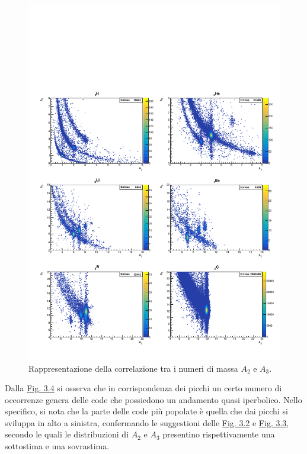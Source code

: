 \documentclass[12pt,a4paper,twoside]{report}
\begin{document}
	\begin{figure}[H]
		\centering
		\includegraphics[width=1.\linewidth]{c_MultiCanvas3.pdf}
		\caption{Rappresentazione della correlazione tra i numeri di massa $A_2$ e $A_3$.}
		\label{fig:a3}
	\end{figure}
	Dalla \hyperref[fig:a3]{Fig. 3.4} si osserva che in corrispondenza dei picchi un certo numero di occorrenze genera delle code che possiedono un andamento quasi iperbolico. Nello specifico, si nota che la parte delle code più popolate è quella che dai picchi si sviluppa in alto a sinistra, confermando le suggestioni delle \hyperref[fig:a1]{Fig. 3.2} e \hyperref[fig:a2]{Fig. 3.3}, secondo le quali le distribuzioni di $A_2$ e $A_3$ presentino rispettivamente una sottostima e una sovrastima.
	
\end{document}
